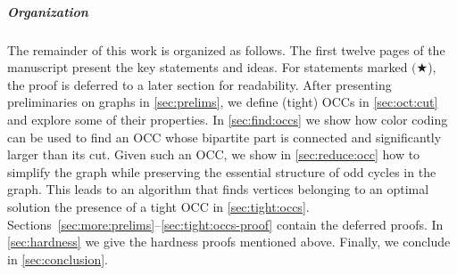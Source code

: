 \subparagraph*{Organization} The remainder of this work is organized as follows. The first twelve pages of the manuscript present the key statements and ideas. For statements marked $(\bigstar$), the proof is deferred to a later section for readability. After presenting preliminaries on graphs in \cref{sec:prelims}, we define (tight) OCCs in \cref{sec:oct:cut} and explore some of their properties. In \cref{sec:find:occs} we show how color coding can be used to find an OCC whose bipartite part is connected and significantly larger than its cut. Given such an OCC, we show in \cref{sec:reduce:occ} how to simplify the graph while preserving the essential structure of odd cycles in the graph. This leads to an algorithm that finds vertices belonging to an optimal solution the presence of a tight OCC in \cref{sec:tight:occs}. Sections~\ref{sec:more:prelims}--\ref{sec:tight:occs-proof} contain the deferred proofs. In \cref{sec:hardness} we give the hardness proofs mentioned above. Finally, we conclude in \cref{sec:conclusion}. 
